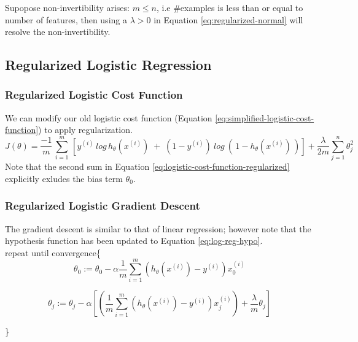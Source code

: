                 Supopose non-invertibility arises: $m \leq n$, i.e \#examples is less than or equal to number of features, then using a $\lambda > 0$ in Equation \ref{eq:regularized-normal} will resolve the non-invertibility.



    \subsection{Regularized Logistic Regression}
            
        \subsubsection{Regularized Logistic Cost Function}
        We can modify our old logistic cost function (Equation \ref{eq:simplified-logistic-cost-function}) to apply regularization. 
                    \begin{equation}
                        \boxed{
                        J(\theta) = \frac{-1}{m} \, \sum_{i=1}^{m}\, [ y^{(i)}\, log\, h_\theta (x^{(i)})\; +\; (1-y^{(i)})\: log\:(\,1-h_\theta(x^{(i)})\,) ] + \frac{\lambda}{2m} \sum_{j=1}^{n} \theta_j^2
                    }
                        \label{eq:logistic-cost-function-regularized}
                    \end{equation}
                    Note that the second sum in Equation \ref{eq:logistic-cost-function-regularized} explicitly exludes the bias term $\theta_0$. 



        \subsubsection{Regularized Logistic Gradient Descent}
            The gradient descent is similar to that of linear regression; however note that the hypothesis function has been updated to Equation \ref{eq:log-reg-hypo}.\\

               repeat until convergence\{  
            \[ \theta_0 := \theta_0 - \alpha \frac{1}{m} \sum_{i=1}^{m} ( h_\theta (x^{(i)}) - y^{(i)}) x_0^{(i)}\] 

            \[
                \theta_j := \theta_j - \alpha [ ( \frac{1}{m} \sum_{i=1}^{m} ( h_\theta (x^{(i)}) - y^{(i)}) x_j^{(i)} ) + \frac{\lambda}{m}\theta_j]
            \] 

        \}




